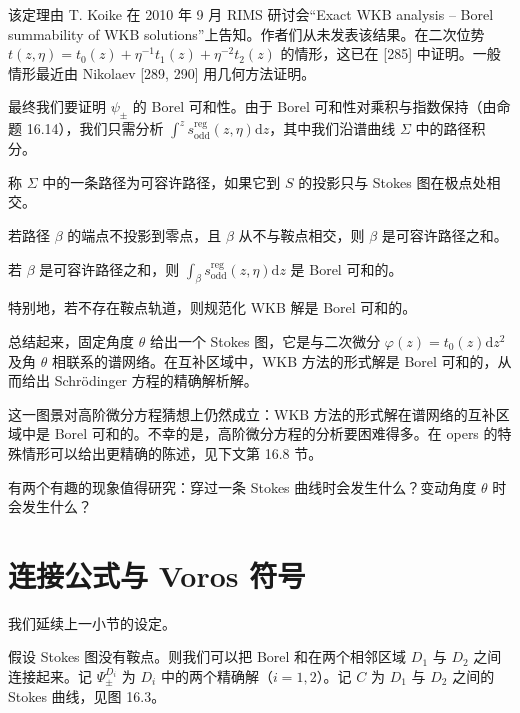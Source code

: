 该定理由 T. Koike 在 2010 年 9 月 RIMS 研讨会“Exact WKB analysis – Borel summability of WKB solutions”上告知。作者们从未发表该结果。在二次位势 $t(z,\eta)=t_0(z)+\eta^{-1}t_1(z)+\eta^{-2}t_2(z)$ 的情形，这已在 [285] 中证明。一般情形最近由 Nikolaev [289, 290] 用几何方法证明。

最终我们要证明 $\psi_\pm$ 的 Borel 可和性。由于 Borel 可和性对乘积与指数保持（由命题 16.14），我们只需分析 $\int^z s^{\mathrm{reg}}_{\mathrm{odd}}(z,\eta)\mathrm{d}z$，其中我们沿谱曲线 $\Sigma$ 中的路径积分。

称 $\Sigma$ 中的一条路径为可容许路径，如果它到 $S$ 的投影只与 Stokes 图在极点处相交。

\begin{proposition}[16.19（{{[216, Lem. 2.20]}}）] 若路径 $\beta$ 的端点不投影到零点，且 $\beta$ 从不与鞍点相交，则 $\beta$ 是可容许路径之和。\end{proposition}

\begin{corollary}[16.20] 若 $\beta$ 是可容许路径之和，则 $\int_\beta s^{\mathrm{reg}}_{\mathrm{odd}}(z,\eta)\mathrm{d}z$ 是 Borel 可和的。\end{corollary}

特别地，若不存在鞍点轨道，则规范化 WKB 解是 Borel 可和的。

总结起来，固定角度 $\theta$ 给出一个 Stokes 图，它是与二次微分 $\varphi(z)=t_0(z)\mathrm{d}z^2$ 及角 $\theta$ 相联系的谱网络。在互补区域中，WKB 方法的形式解是 Borel 可和的，从而给出 Schrödinger 方程的精确解析解。

这一图景对高阶微分方程猜想上仍然成立：WKB 方法的形式解在谱网络的互补区域中是 Borel 可和的。不幸的是，高阶微分方程的分析要困难得多。在 opers 的特殊情形可以给出更精确的陈述，见下文第 16.8 节。

有两个有趣的现象值得研究：穿过一条 Stokes 曲线时会发生什么？变动角度 $\theta$ 时会发生什么？

\section{连接公式与 Voros 符号}

我们延续上一小节的设定。

假设 Stokes 图没有鞍点。则我们可以把 Borel 和在两个相邻区域 $D_1$ 与 $D_2$ 之间连接起来。记 $\Psi^{D_i}_\pm$ 为 $D_i$ 中的两个精确解（$i=1,2$）。记 $C$ 为 $D_1$ 与 $D_2$ 之间的 Stokes 曲线，见图 16.3。


